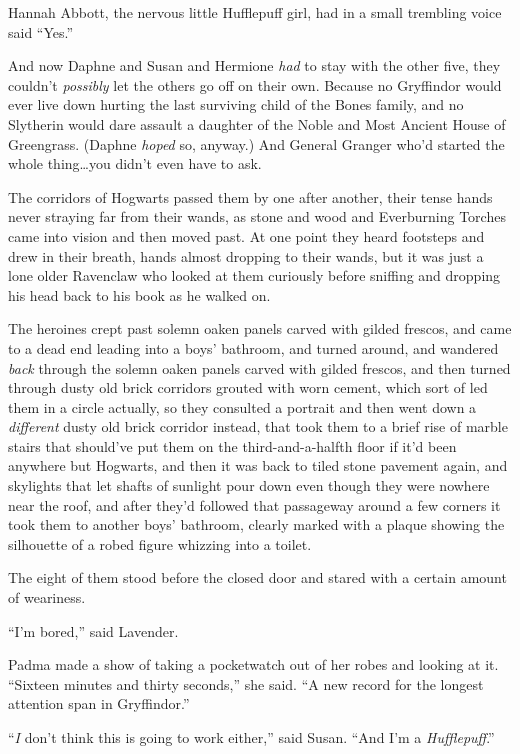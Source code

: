 Hannah Abbott, the nervous little Hufflepuff girl, had in a small trembling
voice said “Yes.”

And now Daphne and Susan and Hermione \emph{had} to stay with the other five,
they couldn’t \emph{possibly} let the others go off on their own. Because no
Gryffindor would ever live down hurting the last surviving child of the Bones
family, and no Slytherin would dare assault a daughter of the Noble and Most
Ancient House of Greengrass. (Daphne \emph{hoped} so, anyway.) And General
Granger who’d started the whole thing…you didn’t even have to ask.

The corridors of Hogwarts passed them by one after another, their tense hands
never straying far from their wands, as stone and wood and Everburning Torches
came into vision and then moved past. At one point they heard footsteps and
drew in their breath, hands almost dropping to their wands, but it was just a
lone older Ravenclaw who looked at them curiously before sniffing and dropping
his head back to his book as he walked on.

The heroines crept past solemn oaken panels carved with gilded frescos, and
came to a dead end leading into a boys’ bathroom, and turned around, and
wandered \emph{back} through the solemn oaken panels carved with gilded
frescos, and then turned through dusty old brick corridors grouted with worn
cement, which sort of led them in a circle actually, so they consulted a
portrait and then went down a \emph{different} dusty old brick corridor
instead, that took them to a brief rise of marble stairs that should’ve put
them on the third-and-a-halfth floor if it’d been anywhere but Hogwarts, and
then it was back to tiled stone pavement again, and skylights that let shafts
of sunlight pour down even though they were nowhere near the roof, and after
they’d followed that passageway around a few corners it took them to another
boys’ bathroom, clearly marked with a plaque showing the silhouette of a robed
figure whizzing into a toilet.

The eight of them stood before the closed door and stared with a certain amount
of weariness.

“I’m bored,” said Lavender.

Padma made a show of taking a pocketwatch out of her robes and looking at it.
“Sixteen minutes and thirty seconds,” she said. “A new record for the longest
attention span in Gryffindor.”

“\emph{I} don’t think this is going to work either,” said Susan. “And I’m a
\emph{Hufflepuff}.”

